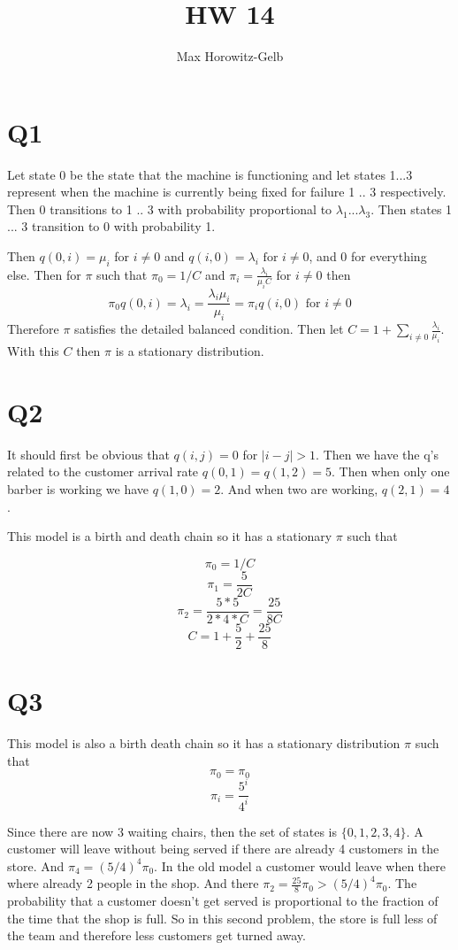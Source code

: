 \documentclass{article}
\title{HW 14}
\author{Max Horowitz-Gelb}
\begin{document}
\maketitle
\section*{Q1}
Let state 0 be the state that the machine is functioning and let states 1...3 represent when the machine is currently being fixed for failure 1 .. 3 respectively. Then 0 transitions to 1 .. 3 with probability proportional to $\lambda_1 ... \lambda_3$. Then states 1 ... 3 transition to 0 with probability 1. 

Then $q(0, i) = \mu_i$ for $i \neq 0$ and $q(i, 0) = \lambda_i \text{ for } i \neq 0$, and 0 for everything else. Then for $\pi$ such that $\pi_0 = 1 / C$ and $\pi_i = \frac{\lambda_i}{\mu_i C} $ for $i \neq 0$ then 
$$
\pi_0 q(0,i) = \lambda_i = \frac{\lambda_i \mu_i}{\mu_i} = \pi_i q(i,0) \text{ for } i \neq 0
$$
Therefore $\pi$ satisfies the detailed balanced condition. Then let $C = 1 + \sum_{i \neq 0} \frac{\lambda_i}{\mu_i}$. With this $C$ then $\pi$ is a stationary distribution. 


\section*{Q2}
It should first be obvious that $q(i,j) = 0$ for $\lvert i - j \rvert > 1$.
Then we have the q's related to the customer arrival rate
$q(0,1) = q(1,2) = 5. $
Then when only one barber is working we have
$q(1,0) = 2$. And when two are working, $q(2,1) = 4$. 

This model is a birth and death chain so it has a stationary  $\pi$ such that

$$\pi_0 = 1 / C$$
$$\pi_1 = \frac{5}{2C}$$
$$\pi_2 = \frac{5*5}{2*4*C} = \frac{25}{8C}$$
$$C = 1 + \frac{5}{2} + \frac{25}{8}$$

\section*{Q3}
This model is also a birth death chain so it has a stationary distribution $\pi$ such that
$$
\pi_0 = \pi_0
$$
$$
\pi_i = \frac{5^i}{4^i}
$$

Since there are now 3 waiting chairs, then the set of states is $\{0, 1, 2,3,4\}$. 
A customer will leave without being served if there are already 4 customers in the store. 
And $\pi_4 = (5/4)^4 \pi_0$. In the old model a customer would leave when there where already 2 people in the shop. And there $\pi_2 = \frac{25}{8} \pi_0 > (5/4)^4 \pi_0$. The probability that a customer doesn't get served is proportional to the fraction of the time that the shop is full. So in this second problem, the store is full less of the team and therefore less customers get turned away.
\end{document}
